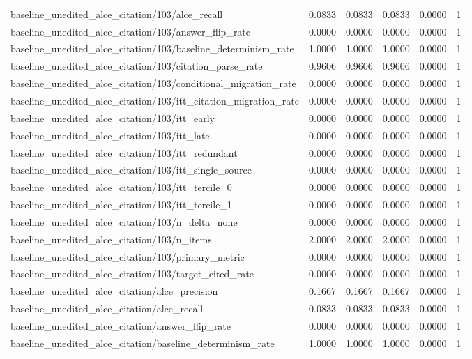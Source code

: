 \begin{table}[h]
\begin{tabular}{lrrrrr}
baseline_unedited_alce_citation/103/alce_recall & 0.0833 & 0.0833 & 0.0833 & 0.0000 & 1 \\
baseline_unedited_alce_citation/103/answer_flip_rate & 0.0000 & 0.0000 & 0.0000 & 0.0000 & 1 \\
baseline_unedited_alce_citation/103/baseline_determinism_rate & 1.0000 & 1.0000 & 1.0000 & 0.0000 & 1 \\
baseline_unedited_alce_citation/103/citation_parse_rate & 0.9606 & 0.9606 & 0.9606 & 0.0000 & 1 \\
baseline_unedited_alce_citation/103/conditional_migration_rate & 0.0000 & 0.0000 & 0.0000 & 0.0000 & 1 \\
baseline_unedited_alce_citation/103/itt_citation_migration_rate & 0.0000 & 0.0000 & 0.0000 & 0.0000 & 1 \\
baseline_unedited_alce_citation/103/itt_early & 0.0000 & 0.0000 & 0.0000 & 0.0000 & 1 \\
baseline_unedited_alce_citation/103/itt_late & 0.0000 & 0.0000 & 0.0000 & 0.0000 & 1 \\
baseline_unedited_alce_citation/103/itt_redundant & 0.0000 & 0.0000 & 0.0000 & 0.0000 & 1 \\
baseline_unedited_alce_citation/103/itt_single_source & 0.0000 & 0.0000 & 0.0000 & 0.0000 & 1 \\
baseline_unedited_alce_citation/103/itt_tercile_0 & 0.0000 & 0.0000 & 0.0000 & 0.0000 & 1 \\
baseline_unedited_alce_citation/103/itt_tercile_1 & 0.0000 & 0.0000 & 0.0000 & 0.0000 & 1 \\
baseline_unedited_alce_citation/103/n_delta_none & 0.0000 & 0.0000 & 0.0000 & 0.0000 & 1 \\
baseline_unedited_alce_citation/103/n_items & 2.0000 & 2.0000 & 2.0000 & 0.0000 & 1 \\
baseline_unedited_alce_citation/103/primary_metric & 0.0000 & 0.0000 & 0.0000 & 0.0000 & 1 \\
baseline_unedited_alce_citation/103/target_cited_rate & 0.0000 & 0.0000 & 0.0000 & 0.0000 & 1 \\
baseline_unedited_alce_citation/alce_precision & 0.1667 & 0.1667 & 0.1667 & 0.0000 & 1 \\
baseline_unedited_alce_citation/alce_recall & 0.0833 & 0.0833 & 0.0833 & 0.0000 & 1 \\
baseline_unedited_alce_citation/answer_flip_rate & 0.0000 & 0.0000 & 0.0000 & 0.0000 & 1 \\
baseline_unedited_alce_citation/baseline_determinism_rate & 1.0000 & 1.0000 & 1.0000 & 0.0000 & 1 \\

\end{tabular}
\end{table}
